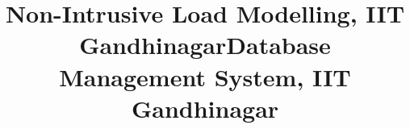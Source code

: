 \documentclass[mm]{simple_style}
\begin{document}
\begin{resume}
\begin{project}
\title{Non-Intrusive Load Modelling, IIT Gandhinagar}
\end{project}
\vspace{-1.5ex}

\iffalse
\begin{project}
\title{Low Cost X-Ray Detector, IIT Bombay}
\supervisor{Supervisor : Achuta Kadambi, MIT Media Lab and Dr. Rajiv Gupta, MGH}
\duration{24 - 31 Jan '14}
\description{
- Came up with the idea of using Selfoc lens array system present in flatbed scanner for the design of low-cost
X-ray detector 
}
\end{project} 
\vspace{-2ex}
\fi

\iffalse
\begin{project}
\title{Hand-Written Digit Recognition using PCA, IIT Gandhinagar}
\supervisor{Supervisor : Babji Srinivasan}
\duration{Nov '16}
\description{
- Implemented a simple MNIST classifier using PCA
}
\end{project} 
\vspace{-2ex}
\fi

\begin{project}
\title{Database Management System, IIT Gandhinagar}
\end{project}
\\[-1.6ex]
\sectionline

\vspace{-1ex}

\end{resume}
\end{document}
